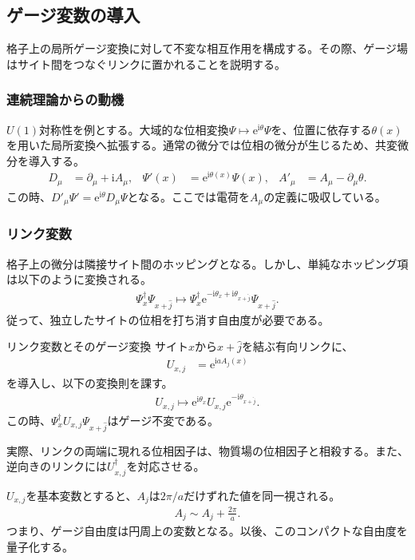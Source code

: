 \documentclass[a4paper,10.5pt]{article}
\numberwithin{equation}{section}
\providecommand{\ii}{\mathrm{i}}
\providecommand{\ee}{\mathrm{e}}
\begin{document}
\subsection{ゲージ変数の導入}
格子上の局所ゲージ変換に対して不変な相互作用を構成する。その際、ゲージ場はサイト間をつなぐリンクに置かれることを説明する。

\subsubsection{連続理論からの動機}
$U(1)$対称性を例とする。大域的な位相変換$\Psi\mapsto\ee^{\ii\theta}\Psi$を、位置に依存する$\theta(x)$を用いた局所変換へ拡張する。通常の微分では位相の微分が生じるため、共変微分を導入する。
\begin{align}
D_\mu&=\partial_\mu+\ii A_\mu,&
\Psi'(x)&=\ee^{\ii\theta(x)}\Psi(x),&
A'_\mu&=A_\mu-\partial_\mu\theta.
\end{align}
この時、$D'_\mu\Psi'=\ee^{\ii\theta}D_\mu\Psi$となる。ここでは電荷を$A_\mu$の定義に吸収している。

\subsubsection{リンク変数}
格子上の微分は隣接サイト間のホッピングとなる。しかし、単純なホッピング項は以下のように変換される。
\begin{align}
\Psi_x^\dagger\Psi_{x+\hat j}\longmapsto
\Psi_x^\dagger\ee^{-\ii\theta_x+\ii\theta_{x+\hat j}}\Psi_{x+\hat j}.
\end{align}
従って、独立したサイトの位相を打ち消す自由度が必要である。
\begin{defbox}{リンク変数とそのゲージ変換}
サイト$x$から$x+\hat j$を結ぶ有向リンクに、
\begin{align}
U_{x,j}&=\ee^{\ii aA_j(x)}
\end{align}
を導入し、以下の変換則を課す。
\begin{align}
U_{x,j}\longmapsto
\ee^{\ii\theta_x}U_{x,j}\ee^{-\ii\theta_{x+\hat j}}.
\end{align}
この時、$\Psi_x^\dagger U_{x,j}\Psi_{x+\hat j}$はゲージ不変である。
\end{defbox}
実際、リンクの両端に現れる位相因子は、物質場の位相因子と相殺する。また、逆向きのリンクには$U_{x,j}^\dagger$を対応させる。

$U_{x,j}$を基本変数とすると、$A_j$は$2\pi/a$だけずれた値を同一視される。
\begin{align}
A_j\sim A_j+\frac{2\pi}a.
\end{align}
つまり、ゲージ自由度は円周上の変数となる。以後、このコンパクトな自由度を量子化する。
\end{document}

